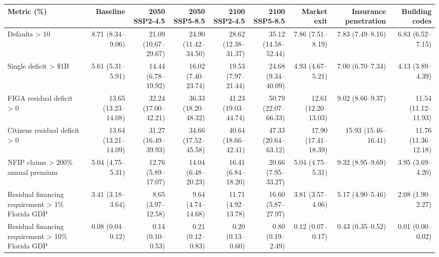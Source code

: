 \begin{tabular}{lrrrrrrrr}
\toprule
Metric (\%) & Baseline & 2050 SSP2-4.5 & 2050 SSP5-8.5 & 2100 SSP2-4.5 & 2100 SSP5-8.5 & Market exit & Insurance penetration & Building codes \\
\midrule
Defaults > 10 & 8.71 (8.34--9.06) & 21.09 (10.67--29.67) & 24.90 (11.42--34.50) & 28.62 (12.38--31.37) & 35.12 (14.58--52.44) & 7.86 (7.51--8.19) & 7.83 (7.49--8.16) & 6.83 (6.52--7.15) \\
Single deficit > \$1B & 5.61 (5.31--5.91) & 14.44 (6.78--19.92) & 16.02 (7.40--23.74) & 19.53 (7.97--21.44) & 24.68 (9.34--40.09) & 4.93 (4.67--5.21) & 7.00 (6.70--7.34) & 4.13 (3.89--4.39) \\
\midrule
FIGA residual deficit > 0 & 13.65 (13.23--14.08) & 32.24 (17.00--42.21) & 36.33 (18.20--48.32) & 41.23 (19.03--44.74) & 50.79 (22.07--66.33) & 12.61 (12.20--13.03) & 9.02 (8.66--9.37) & 11.54 (11.12--11.93) \\
Citizens residual deficit > 0 & 13.64 (13.21--14.09) & 31.27 (16.49--39.93) & 34.66 (17.52--45.58) & 40.64 (18.66--42.41) & 47.33 (20.64--63.12) & 17.90 (17.41--18.39) & 15.93 (15.46--16.41) & 11.76 (11.36--12.18) \\
NFIP claims > 200\% annual premium & 5.04 (4.75--5.31) & 12.76 (5.89--17.07) & 14.04 (6.48--20.23) & 16.41 (6.84--18.20) & 20.66 (7.95--33.27) & 5.04 (4.75--5.31) & 9.32 (8.95--9.69) & 3.95 (3.69--4.20) \\
\midrule
Residual financing requirement > 1\% Florida GDP & 3.41 (3.18--3.64) & 8.65 (3.97--12.58) & 9.64 (4.74--14.68) & 11.71 (4.92--13.78) & 16.60 (5.87--27.97) & 3.81 (3.57--4.06) & 5.17 (4.90--5.46) & 2.08 (1.90--2.27) \\
Residual financing requirement > 10\% Florida GDP & 0.08 (0.04--0.12) & 0.14 (0.10--0.53) & 0.21 (0.12--0.83) & 0.20 (0.13--0.60) & 0.80 (0.19--2.49) & 0.12 (0.07--0.17) & 0.43 (0.35--0.52) & 0.01 (0.00--0.02) \\
\bottomrule
\end{tabular}
